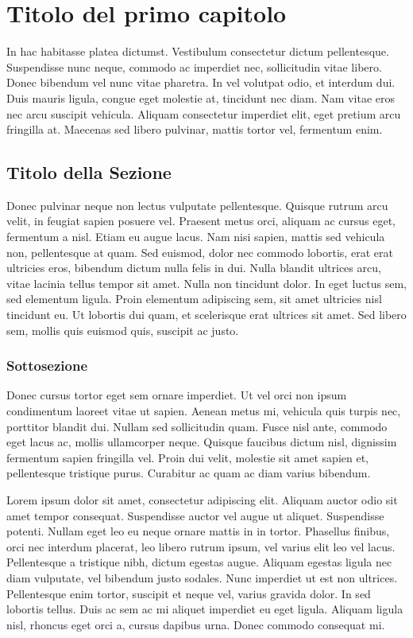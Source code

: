 \chapter{Titolo del primo capitolo}
In hac habitasse platea dictumst. Vestibulum consectetur dictum pellentesque. Suspendisse nunc neque, commodo ac imperdiet nec, sollicitudin vitae libero. Donec bibendum vel nunc vitae pharetra. In vel volutpat odio, et interdum dui. Duis mauris ligula, congue eget molestie at, tincidunt nec diam. Nam vitae eros nec arcu suscipit vehicula. Aliquam consectetur imperdiet elit, eget pretium arcu fringilla at. Maecenas \cite{Knu86} sed libero pulvinar, mattis tortor vel, fermentum enim.

\section{Titolo della Sezione}
Donec pulvinar neque non lectus vulputate pellentesque. Quisque rutrum arcu velit, in feugiat sapien posuere vel. Praesent metus orci, aliquam ac cursus eget, fermentum a nisl. Etiam eu augue lacus. Nam nisi sapien, mattis sed vehicula non, pellentesque at quam. Sed euismod, dolor nec commodo lobortis, erat erat ultricies eros, bibendum dictum nulla felis in dui. Nulla blandit ultrices arcu, vitae lacinia tellus tempor sit amet. Nulla non tincidunt dolor. In eget luctus sem, sed elementum ligula. Proin elementum adipiscing sem, sit amet ultricies nisl tincidunt eu. Ut lobortis dui quam, et scelerisque erat ultrices sit amet. Sed libero sem, mollis quis euismod quis, suscipit ac justo.

\subsection{Sottosezione}
Donec cursus tortor eget sem ornare imperdiet. Ut vel orci non ipsum condimentum laoreet vitae ut sapien. Aenean metus mi, vehicula quis turpis nec, porttitor blandit dui. Nullam sed sollicitudin quam. Fusce nisl ante, commodo eget lacus ac, mollis ullamcorper neque. Quisque faucibus dictum nisl, dignissim fermentum sapien fringilla vel. Proin dui velit, molestie sit amet sapien et, pellentesque tristique purus. Curabitur ac quam ac diam varius bibendum.

Lorem ipsum dolor sit amet, consectetur adipiscing elit. Aliquam auctor odio sit amet tempor consequat. Suspendisse auctor vel augue ut aliquet. Suspendisse potenti. Nullam eget leo eu neque ornare mattis in in tortor. Phasellus finibus, orci nec interdum placerat, leo libero rutrum ipsum, vel varius elit leo vel lacus. Pellentesque a tristique nibh, dictum egestas augue. Aliquam egestas ligula nec diam vulputate, vel bibendum justo sodales. Nunc imperdiet ut est non ultrices. Pellentesque enim tortor, suscipit et neque vel, varius gravida dolor. In sed lobortis tellus. Duis ac sem ac mi aliquet imperdiet eu eget ligula. Aliquam ligula nisl, rhoncus eget orci a, cursus dapibus urna. Donec commodo consequat mi.

